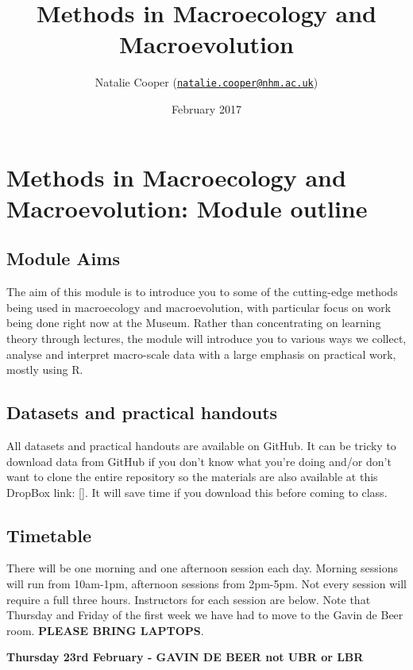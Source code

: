 \documentclass[]{book}
\title{Methods in Macroecology and Macroevolution}
\author{Natalie Cooper
(\href{mailto:natalie.cooper@nhm.ac.uk}{\nolinkurl{natalie.cooper@nhm.ac.uk}})}
\date{February 2017}
\begin{document}
\maketitle

{
\setcounter{tocdepth}{1}
\tableofcontents
}
\chapter{Methods in Macroecology and Macroevolution: Module
outline}\label{methods-in-macroecology-and-macroevolution-module-outline}

\section{Module Aims}\label{module-aims}

The aim of this module is to introduce you to some of the cutting-edge
methods being used in macroecology and macroevolution, with particular
focus on work being done right now at the Museum. Rather than
concentrating on learning theory through lectures, the module will
introduce you to various ways we collect, analyse and interpret
macro-scale data with a large emphasis on practical work, mostly using
R.

\section{Datasets and practical
handouts}\label{datasets-and-practical-handouts}

All datasets and practical handouts are available on GitHub. It can be
tricky to download data from GitHub if you don't know what you're doing
and/or don't want to clone the entire repository so the materials are
also available at this DropBox link: {[}{]}. It will save time if you
download this before coming to class.

\section{Timetable}\label{timetable}

There will be one morning and one afternoon session each day. Morning
sessions will run from 10am-1pm, afternoon sessions from 2pm-5pm. Not
every session will require a full three hours. Instructors for each
session are below. Note that Thursday and Friday of the first week we
have had to move to the Gavin de Beer room. \textbf{PLEASE BRING
LAPTOPS}.

\textbf{Thursday 23rd February - GAVIN DE BEER not UBR or LBR}
\end{document}
